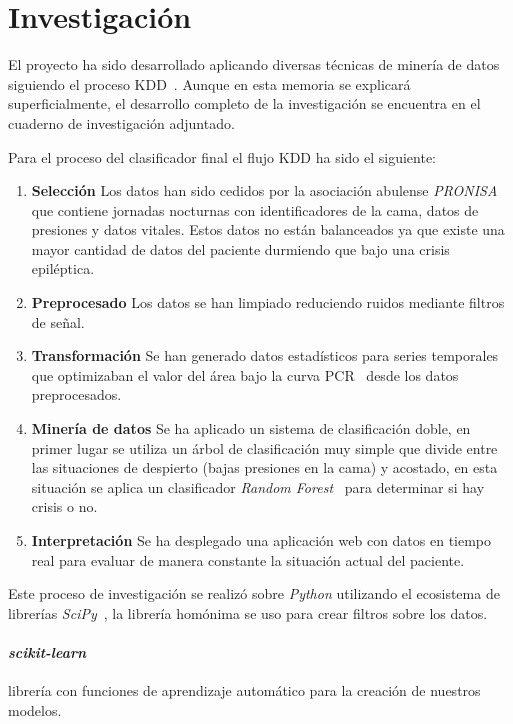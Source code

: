 
\section{Investigación}

El proyecto ha sido desarrollado aplicando diversas técnicas de minería de datos siguiendo el proceso KDD~\cite{ubu:mineria1}. Aunque en esta memoria se explicará superficialmente, el desarrollo completo de la investigación se encuentra en el cuaderno de investigación adjuntado.

Para el proceso del clasificador final el flujo KDD ha sido el siguiente:

\begin{enumerate}
	\item \textbf{Selección}
		Los datos han sido cedidos por la asociación abulense \textit{PRONISA} que contiene jornadas nocturnas con identificadores de la cama, datos de presiones y datos vitales. Estos datos no están balanceados ya que existe una mayor cantidad de datos del paciente durmiendo que bajo una crisis epiléptica.
	\item \textbf{Preprocesado}
		Los datos se han limpiado reduciendo ruidos mediante filtros de señal.
	\item \textbf{Transformación}
		Se han generado datos estadísticos para series temporales que optimizaban el valor del área bajo la curva PCR~\cite{saito2015precision} desde los datos preprocesados.
	\item \textbf{Minería de datos}
		Se ha aplicado un sistema de clasificación doble, en primer lugar se utiliza un árbol de clasificación muy simple que divide entre las situaciones de despierto (bajas presiones en la cama) y acostado, en esta situación se aplica un clasificador \textit{Random Forest}~\cite{breiman2001random} para determinar si hay crisis o no.
	\item \textbf{Interpretación}
		Se ha desplegado una aplicación web con datos en tiempo real para evaluar de manera constante la situación actual del paciente.
\end{enumerate}

Este proceso de investigación se realizó sobre \textit{Python} utilizando el ecosistema de librerías \textit{SciPy}~\cite{tool:scipy}, la librería homónima se uso para crear filtros sobre los datos.

\paragraph{\textit{scikit-learn}~\cite{tool:scikit-learn}}librería con funciones de aprendizaje automático para la creación de nuestros modelos.
